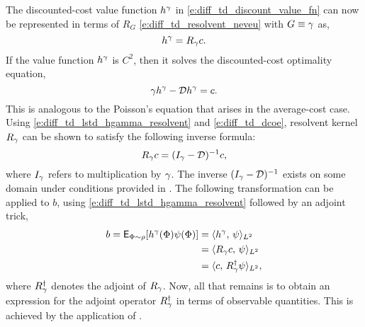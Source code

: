 The discounted-cost value function $h^\gamma$ in \eqref{e:diff_td_discount_value_fn} can now be represented in terms of $R_G$ \eqref{e:diff_td_resolvent_neveu} with $G \equiv \gamma$ as,
\begin{equation}
h^\discount = R_\discount c.
\label{e:diff_td_lstd_hgamma_resolvent}
\end{equation}
If the value function $h^\gamma$ is $C^2$, then it solves the discounted-cost optimality equation,
\begin{equation}
\discount h^\discount - \generate h^\discount =  c.
\label{e:diff_td_dcoe}
\end{equation}
This is analogous to the Poisson's equation that arises in the average-cost case. 
Using \eqref{e:diff_td_lstd_hgamma_resolvent} and \eqref{e:diff_td_dcoe}, resolvent kernel $R_\gamma$ can be shown to satisfy the following inverse formula:
\begin{equation}
R_\gamma c = ( I_\gamma - {\cal D})^{-1} c,
\end{equation}
where $I_\gamma$ refers to multiplication by $\gamma$. The inverse $(I_\gamma - {\cal D})^{-1}$ exists on some domain under conditions provided in \cite{devkonmey17a}.  
The following transformation can be applied to $b$, using \eqref{e:diff_td_lstd_hgamma_resolvent} followed by an adjoint trick,
\begin{equation}
\begin{aligned}
b = \Expect_{\markovstate \sim \pr} [h^\discount(\markovstate) \basis(\markovstate) ] &= \langle h^\discount, \, \basis \rangle_{L^2}\\
& = \langle R_\discount c, \,\basis \rangle_{L^2} \\
& = \langle c,\, R^\dagger_\discount \basis \rangle_{L^2},
\label{e:diff_td_lstd_b_R_adjoint}
\end{aligned}
\end{equation}
where $R^\dagger_\gamma$ denotes the adjoint of $R_\gamma$. Now, all that remains is to obtain an expression for the adjoint operator $R^\dagger_\gamma$ in terms of observable quantities. This is achieved by the application of .

